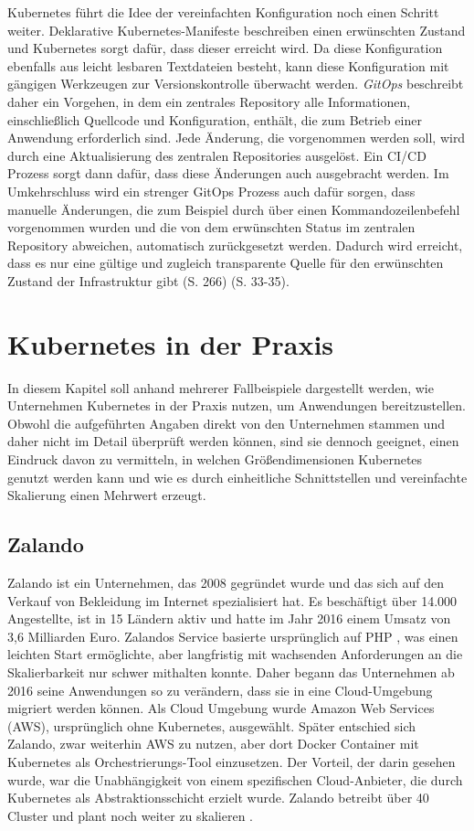 \documentclass[11pt,a4paper]{article}
\begin{document}
Kubernetes führt die Idee der vereinfachten Konfiguration noch einen Schritt weiter.
Deklarative Kubernetes-Manifeste beschreiben einen erwünschten Zustand
und Kubernetes sorgt dafür, dass dieser erreicht wird.
Da diese Konfiguration ebenfalls aus leicht lesbaren Textdateien besteht,
kann diese Konfiguration mit gängigen Werkzeugen zur Versionskontrolle
überwacht werden. \emph{GitOps} beschreibt daher ein Vorgehen,
in dem ein zentrales Repository alle Informationen, einschließlich Quellcode und Konfiguration,
enthält, die zum Betrieb einer Anwendung erforderlich sind.
Jede Änderung, die vorgenommen werden soll, wird durch eine Aktualisierung
des zentralen Repositories ausgelöst. Ein CI/CD Prozess sorgt dann dafür,
dass diese Änderungen auch ausgebracht werden.
Im Umkehrschluss wird ein strenger GitOps Prozess auch dafür sorgen,
dass manuelle Änderungen, die zum Beispiel durch über einen Kommandozeilenbefehl
vorgenommen wurden und die von dem erwünschten Status im zentralen Repository
abweichen, automatisch zurückgesetzt werden.
Dadurch wird erreicht, dass es nur eine gültige und zugleich transparente
Quelle für den erwünschten Zustand der Infrastruktur gibt \cite{domingus2022cloud} (S. 266) \cite{cicd_with_kubernetes_devops} (S. 33-35).

\section{Kubernetes in der Praxis}
\label{sec:Fallbeispiele}
In diesem Kapitel soll anhand mehrerer Fallbeispiele dargestellt werden, wie Unternehmen
Kubernetes in der Praxis nutzen, um Anwendungen bereitzustellen.
Obwohl die aufgeführten Angaben direkt von den Unternehmen stammen und daher nicht im Detail
überprüft werden können, sind sie dennoch geeignet, einen Eindruck davon zu vermitteln,
in welchen Größendimensionen Kubernetes genutzt werden kann und wie es durch
einheitliche Schnittstellen und vereinfachte Skalierung
einen Mehrwert erzeugt.
\subsection{Zalando}
Zalando ist ein Unternehmen, das 2008 gegründet wurde und das sich auf den Verkauf
von Bekleidung im Internet spezialisiert hat. Es beschäftigt über 14.000 Angestellte,
ist in 15 Ländern aktiv und hatte im Jahr 2016 einem Umsatz von 3,6 Milliarden Euro.
Zalandos Service basierte ursprünglich auf PHP \cite{php}, was einen leichten Start ermöglichte,
aber langfristig mit wachsenden Anforderungen an die Skalierbarkeit nur schwer mithalten konnte.
Daher begann das Unternehmen ab 2016 seine Anwendungen so zu verändern, dass sie
in eine Cloud-Umgebung migriert werden können. Als Cloud Umgebung wurde Amazon Web Services (AWS),
ursprünglich ohne Kubernetes, ausgewählt. Später entschied sich Zalando,
zwar weiterhin AWS zu nutzen, aber dort Docker Container mit Kubernetes
als Orchestrierungs-Tool einzusetzen. Der Vorteil, der darin gesehen wurde,
war die Unabhängigkeit von einem spezifischen Cloud-Anbieter, die durch
Kubernetes als Abstraktionsschicht erzielt wurde.
Zalando betreibt über 40 Cluster und plant noch weiter zu skalieren \cite{story_zalando}.
\end{document}
